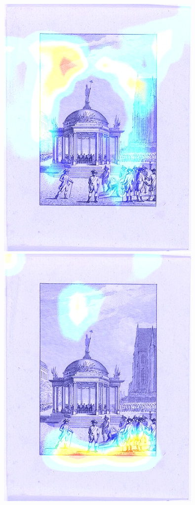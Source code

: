 \begin{figure}[!htb]
  \includegraphics[width=\linewidth]{./Images/Chapter03/imagenet_saliencies_2.jpeg}
\endminipage
{}
  \includegraphics[width=\linewidth]{./Images/Chapter03/rijksnet_saliencies_2.jpeg}

\end{figure}
